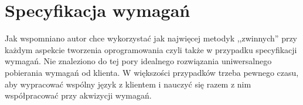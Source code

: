 \chapter{Specyfikacja wymagań}
\label{cha:specyfikacjaWymagan}

Jak wspomniano  autor chce wykorzystać jak najwięcej metodyk ,,zwinnych'' przy każdym aspekcie tworzenia oprogramowania czyli także w przypadku specyfikacji wymagań. Nie znaleziono do tej pory idealnego rozwiązania uniwersalnego pobierania wymagań od klienta. W większości przypadków trzeba pewnego czasu, aby wypracować wspólny język z klientem i nauczyć się razem z nim współpracować przy akwizycji wymagań.



